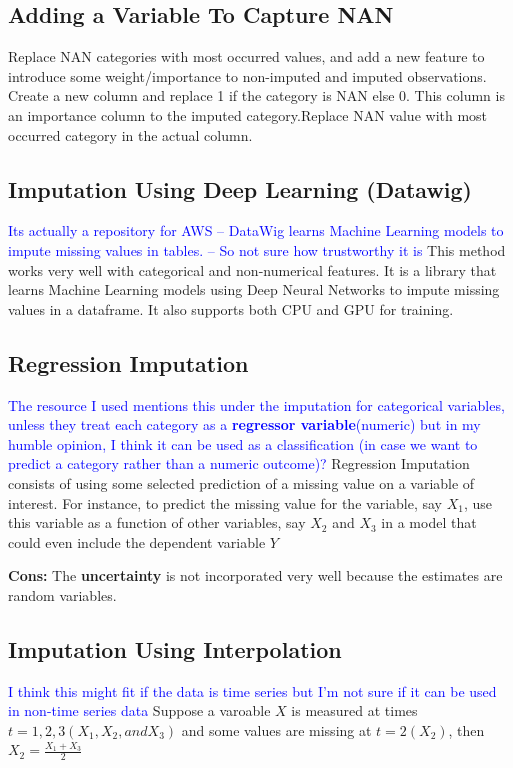 \documentclass{article}
\begin{document}
\subsection{ Adding a Variable To Capture NAN}
Replace NAN categories with most occurred values, and add a new feature to introduce some weight/importance to non-imputed and imputed observations. Create a new column and replace 1 if the category is NAN else 0. This column is an importance column to the imputed category.Replace NAN value with most occurred category in the actual column.

\subsection{Imputation Using Deep Learning (Datawig)}
\textcolor{blue}{Its actually a repository for AWS -- DataWig learns Machine Learning models to impute missing values in tables. -- So not sure how trustworthy it is}
This method works very well with categorical and non-numerical features. It is a library that learns Machine Learning models using Deep Neural Networks to impute missing values in a dataframe. It also supports both CPU and GPU for training.

\subsection{Regression Imputation}
\textcolor{blue}{The resource I used mentions this under the imputation for categorical variables, unless they treat each category as a \textbf{regressor variable}(numeric) but in my humble opinion, I think it can be used as a classification (in case we want to predict a category rather than a numeric outcome)?}
Regression Imputation consists of using some selected prediction of a missing value  on a variable of interest. For instance, to predict the missing value for the variable, say $X_1$, use this variable as a function of other variables, say $X_2$ and $X_3$ in a model that could even include the dependent variable $Y$

\textbf{Cons:} The \textbf{uncertainty} is not incorporated very well because the estimates are random variables.

\subsection{Imputation Using Interpolation}
\textcolor{blue}{I think this might fit if the data is time series but I'm not sure if it can be used in non-time series data} Suppose a varoable $X$ is measured at times $t = 1, 2, 3 (X_1, X_2, and X_3)$ and some values are missing at $t=2 (X_2)$, then $X_2 = \frac{X_1 + X_3}{2}$
\end{document}
